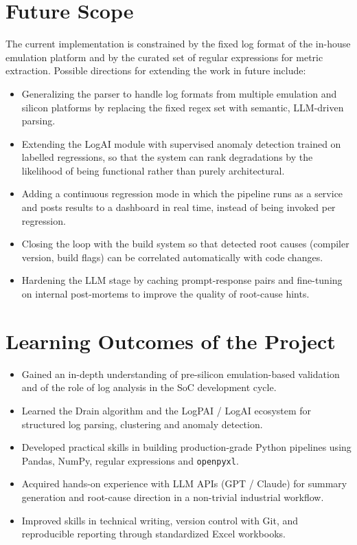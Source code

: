 \section{Future Scope}
The current implementation is constrained by the fixed log format of the in-house emulation platform and by the curated set of regular expressions for metric extraction. Possible directions for extending the work in future include:
\begin{itemize}
\item Generalizing the parser to handle log formats from multiple emulation and silicon platforms by replacing the fixed regex set with semantic, LLM-driven parsing.
\item Extending the LogAI module with supervised anomaly detection trained on labelled regressions, so that the system can rank degradations by the likelihood of being functional rather than purely architectural.
\item Adding a continuous regression mode in which the pipeline runs as a service and posts results to a dashboard in real time, instead of being invoked per regression.
\item Closing the loop with the build system so that detected root causes (compiler version, build flags) can be correlated automatically with code changes.
\item Hardening the LLM stage by caching prompt-response pairs and fine-tuning on internal post-mortems to improve the quality of root-cause hints.
\end{itemize}

\section{Learning Outcomes of the Project}
\begin{itemize}
\item Gained an in-depth understanding of pre-silicon emulation-based validation and of the role of log analysis in the SoC development cycle.
\item Learned the Drain algorithm and the LogPAI / LogAI ecosystem for structured log parsing, clustering and anomaly detection.
\item Developed practical skills in building production-grade Python pipelines using Pandas, NumPy, regular expressions and \texttt{openpyxl}.
\item Acquired hands-on experience with LLM APIs (GPT / Claude) for summary generation and root-cause direction in a non-trivial industrial workflow.
\item Improved skills in technical writing, version control with Git, and reproducible reporting through standardized Excel workbooks.
\end{itemize}
